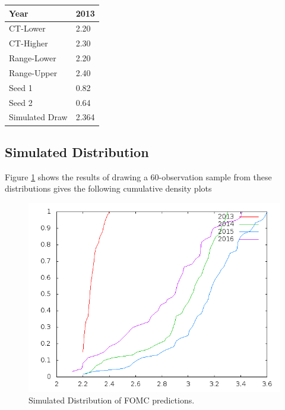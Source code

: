\documentclass[11pt]{article}
\begin{document}
\begin{tabular}{ll}
Year & 2013\\
\hline
CT-Lower & 2.20 \footnotemark\\
CT-Higher & 2.30 \footnotemark\\
Range-Lower & 2.20 \footnotemark\\
Range-Upper & 2.40 \footnotemark\\
\hline
Seed 1 & 0.82 \footnotemark\\
Seed 2 & 0.64 \footnotemark[13]{}\\
Simulated Draw & 2.364 \footnotemark\\
\end{tabular}

\subsection{Simulated Distribution}
\label{sec-2-1}

Figure \ref{fig:Sim} shows the results of drawing a 60-observation sample from these distributions gives the following cumulative density plots 

\begin{figure}[htb]
\centering
\includegraphics[width=.9\linewidth]{./example2.png}
\caption{\label{fig:Sim}Simulated Distribution of FOMC predictions.}
\end{figure}
\end{document}
